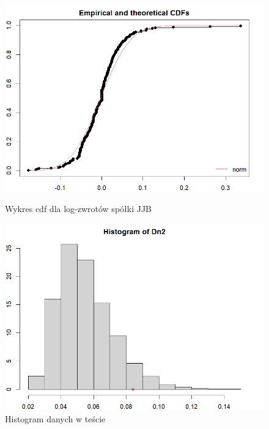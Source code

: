 \documentclass[a4paper,11pt]{article}
\begin{document}
\begin{figure}[!htb]
\begin{minipage}{0.48\textwidth}
        \centering
        \includegraphics[width=\linewidth]{jjb_cdf_log.png}
        \caption{Wykres cdf dla log-zwrotów spółki JJB}
        \label{fig:jjb_cdf_log}
    \end{minipage}\hfill
    \begin{minipage}{0.48\textwidth}
        \centering
        \includegraphics[width=\linewidth]{jjb_histMC.png}
        \caption{Histogram danych w teście}
        \label{fig:jjb_histMC}
    \end{minipage}

\end{figure}
\end{document}
